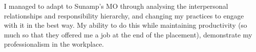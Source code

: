 I managed to adapt to Sunamp's MO through analysing the interpersonal relationships and responsibility hierarchy, and changing my practices to engage with it in the best way.
My ability to do this while maintaining productivity (so much so that they offered me a job at the end of the placement), demonstrate my professionalism in the workplace.




